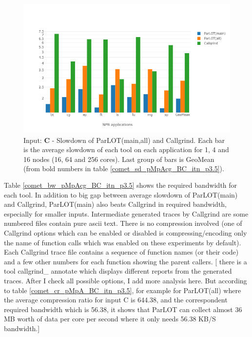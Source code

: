 \begin{figure}[!t]
\centering
\includegraphics[width=6in]{figs.comet/comet_chartAvg_sd_C_p3_5.png}
\caption{ Input: \textbf{C} - Slowdown of ParLOT(main,all) and Callgrind. Each bar is the average slowdown of each tool on each application for 1, 4 and 16 nodes (16, 64 and 256 cores). Last group of bars is GeoMean (from bold numbers in table \ref{comet_sd_pMpAcg_BC_itn_p3.5}). 
}
\label{comet_chartAvg_sd_C_p3_5}
\end{figure}





Table \ref{comet_bw_pMpAcg_BC_itn_p3.5} shows the required bandwidth for each tool. In addition to big gap between average slowdown of ParLOT(main) and Callgrind, ParLOT(main) also beats Callgrind in required bandwidth, especially for smaller inputs. Intermediate generated traces by Callgrind are some numbered files contain pure ascii text. There is no compression involved (one of Callgrind options which can be enabled or disabled is compressing/encoding only the name of function calls which was enabled on these experiments by default). Each Callgrind trace file contains a sequence of function names (or their code) and a few other numbers for each function showing the parent callers. [ there is a tool callgrind\_ annotate which displays different reports from the generated traces. After I check all possible options, I add more analysis here. But according to table \ref{comet_cr_pMpA_BC_itn_p3.5}, for example for ParLOT(all) where the average compression ratio for input C is 644.38, and the correspondent required bandwidth which is 56.38, it shows that ParLOT can collect almost 36 MB worth of data per core per second where it only needs 56.38 KB/S bandwidth.] \\


